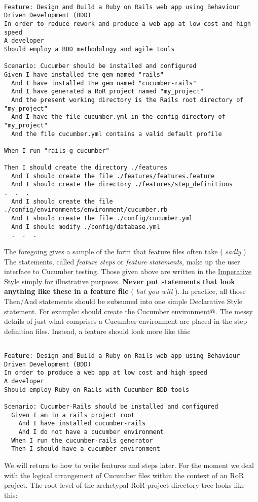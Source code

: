 \documentclass[10pt]{book}
\begin{document}
\begin{verbatim}

Feature: Design and Build a Ruby on Rails web app using Behaviour Driven Development (BDD)
In order to reduce rework and produce a web app at low cost and high speed
A developer 
Should employ a BDD methodology and agile tools

Scenario: Cucumber should be installed and configured
Given I have installed the gem named "rails"
  And I have installed the gem named "cucumber-rails"
  And I have generated a RoR project named "my_project"
  And the present working directory is the Rails root directory of "my_project"
  And I have the file cucumber.yml in the config directory of "my_project"
  And the file cucumber.yml contains a valid default profile

When I run "rails g cucumber"

Then I should create the directory ./features
  And I should create the file ./features/features.feature
  And I should create the directory ./features/step_definitions
.  .  .
  And I should create the file ./config/environments/environment/cucumber.rb
  And I should create the file ./config/cucumber.yml
  And I should modify ./config/database.yml
  .  .  .

\end{verbatim}
The foregoing gives a sample of the form that feature files often take ( \emph{sadly} ).  The statements, called \emph{feature steps} or \emph{feature statements}, make up the user interface to Cucumber testing.  Those given above are written in the \href{http://www.benmabey.com/2008/05/19/imperative-vs-declarative-scenarios-in-user-stories/}{Imperative Style} simply for illustrative purposes.  \textbf{Never put statements that look anything like these in a feature file} ( \emph{but you will} ).  In practice, all those Then/And statements should be subsumed into one simple Declarative Style statement. For example: \verb@I should create the Cucumber environment@. The messy details of just what comprises a Cucumber environment are placed in the step definition files.  Instead, a feature should look more like this:

\begin{verbatim}

Feature: Design and Build a Ruby on Rails web app using Behaviour Driven Development (BDD)
In order to produce a web app at low cost and high speed
A developer 
Should employ Ruby on Rails with Cucumber BDD tools

Scenario: Cucumber-Rails should be installed and configured
  Given I am in a rails project root
    And I have installed cucumber-rails
    And I do not have a cucumber environment
  When I run the cucumber-rails generator
  Then I should have a cucumber environment

\end{verbatim}
We will return to how to write features and steps later.  For the moment we deal with the logical arrangement of Cucumber files within the context of an RoR project.  The root level of the archetypal RoR project directory tree looks like this:
\end{document}
